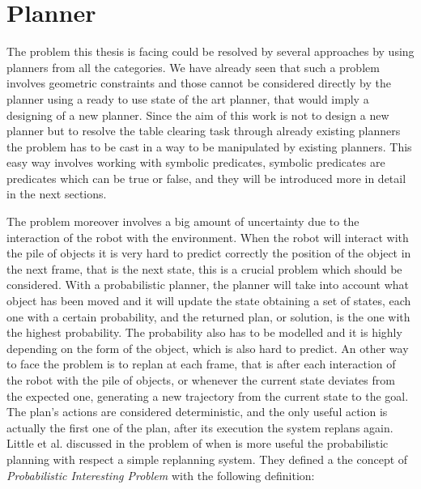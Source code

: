 \section{Planner}
The problem this thesis is facing could be resolved by several approaches by using planners from all the categories. We have already seen that such a problem involves geometric constraints and those cannot be considered directly by the planner using a ready to use state of the art planner, that would imply a designing of a new planner. Since the aim of this work is not to design a new planner but to resolve the table clearing task through already existing planners the problem has to be cast in a way to be manipulated by existing planners. This easy way involves working with symbolic predicates, symbolic predicates are predicates which can be true or false, and they will be introduced more in detail in the next sections. 

The problem moreover involves a big amount of uncertainty due to the interaction of the robot with the environment. When the robot will interact with the pile of objects it is very hard to predict correctly the position of the object in the next frame, that is the next state, this is a crucial problem which should be considered. With a probabilistic planner, the planner will take into account what object has been moved and it will update the state obtaining a set of states, each one with a certain probability, and the returned plan, or solution, is the one with the highest probability. The probability also has to be modelled and it is highly depending on the form of the object, which is also hard to predict. An other way to face the problem is to replan at each frame, that is after each interaction of the robot with the pile of objects, or whenever the current state deviates from
the expected one, generating a new trajectory from
the current state to the goal. The plan's actions are considered deterministic, and the only useful action is actually the first one of the plan, after its execution the system replans again. Little et al. discussed in \cite{little2007probabilistic} the problem of when is more useful the probabilistic planning with respect a simple replanning system. 
They defined a the concept of \textit{Probabilistic Interesting Problem} with the following definition:

